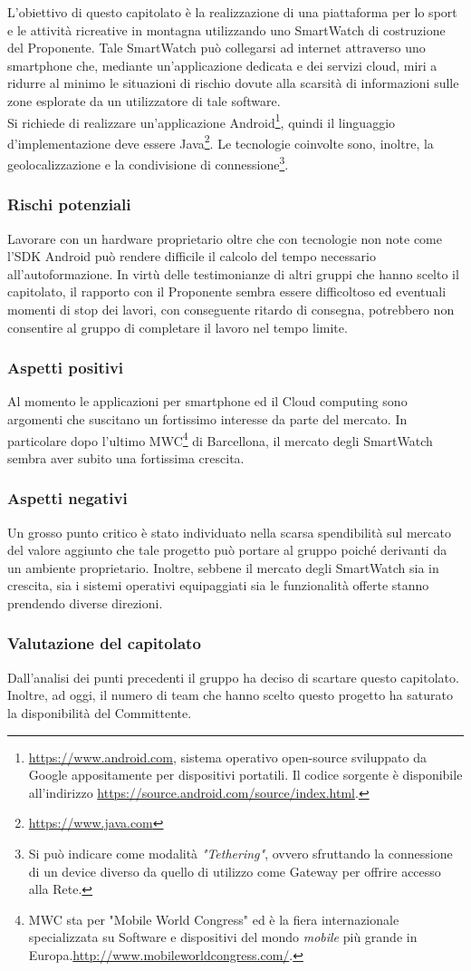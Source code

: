 L'obiettivo di questo capitolato è la realizzazione di una piattaforma per lo sport e le attività ricreative in montagna utilizzando uno SmartWatch di costruzione del Proponente. Tale SmartWatch può collegarsi ad internet attraverso uno smartphone che, mediante un'applicazione dedicata e dei \gls{servizi cloud}, miri a ridurre al minimo le situazioni di rischio dovute alla scarsità di informazioni sulle zone esplorate da un utilizzatore di tale software.\\
Si richiede di realizzare un'applicazione Android\footnote{\url{https://www.android.com}, sistema operativo open-source sviluppato da Google appositamente per dispositivi portatili. Il codice sorgente è disponibile all'indirizzo \url{https://source.android.com/source/index.html}.}, quindi il linguaggio d'implementazione deve essere \gls{Java}\footnote{\url{https://www.java.com}}. Le tecnologie coinvolte sono, inoltre, la geolocalizzazione e la condivisione di connessione\footnote{Si può indicare come modalità \textit{"Tethering"}, ovvero sfruttando la connessione di un device diverso da quello di utilizzo come Gateway per offrire accesso alla Rete.}.
\subsubsection{Rischi potenziali}
Lavorare con un hardware proprietario oltre che con tecnologie non note come l'\gls{SDK} Android può rendere difficile il calcolo del tempo necessario all’autoformazione.
In virtù delle testimonianze di altri gruppi che hanno scelto il capitolato, il rapporto con il Proponente sembra essere difficoltoso ed eventuali momenti di stop dei lavori, con conseguente ritardo di consegna, potrebbero non consentire al gruppo di completare il lavoro nel tempo limite.
\subsubsection{Aspetti positivi}
Al momento le applicazioni per smartphone ed il Cloud computing sono argomenti che suscitano un fortissimo interesse da parte del mercato. In particolare dopo l'ultimo MWC\footnote{MWC sta per "Mobile World Congress" ed è la fiera internazionale specializzata su Software e dispositivi del mondo \textit{mobile} più grande in Europa.\url{http://www.mobileworldcongress.com/}.} di Barcellona, il mercato degli SmartWatch sembra aver subito una fortissima crescita.
\subsubsection{Aspetti negativi}
Un grosso punto critico è stato individuato nella scarsa spendibilità sul mercato del valore aggiunto che tale progetto può portare al gruppo poiché derivanti da un ambiente proprietario. Inoltre, sebbene il mercato degli SmartWatch sia in crescita, sia i sistemi operativi equipaggiati sia le funzionalità offerte stanno prendendo diverse direzioni.
\subsubsection{Valutazione del capitolato}
Dall'analisi dei punti precedenti il gruppo ha deciso di scartare questo capitolato.
Inoltre, ad oggi, il numero di team che hanno scelto questo progetto ha saturato la disponibilità del Committente.

